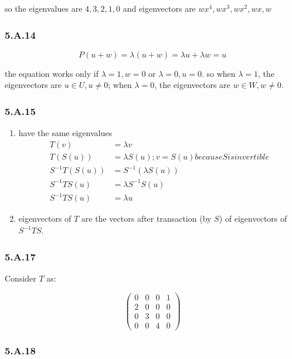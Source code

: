so the eigenvalues are $4, 3, 2, 1, 0$ and eigenvectors are $wx^{4}, wx^{3}, wx^{2}, wx, w$

\subsubsection*{5.A.14}

\[P(u+w) = \lambda (u+w) = \lambda u + \lambda w = u\]

the equation works only if $\lambda = 1, w=0$ or $\lambda = 0, u = 0$.
so when $\lambda = 1$, the eigenvectors are $ u\in U, u\neq 0$; when $\lambda = 0$, the eigenvectors are $w \in W, w\neq 0$.

\subsubsection*{5.A.15}
\begin{enumerate}[label=(\alph*)]
\item have the same eigenvalues
\begin{equation*}
    \begin{split}
    T(v) &= \lambda v \\
    T(S(u)) &= \lambda S(u) ; v = S(u) because S is invertible \\
    S^{-1}T(S(u)) &= S^{-1}(\lambda S(u)) \\
    S^{-1}TS(u) &= \lambda S^{-1}S(u) \\
    S^{-1}TS(u) &= \lambda u
\end{split}
\end{equation*}

\item eigenvectors of $T$  are the vectors after transaction (by $S$) of eigenvectors of $S^{-1}TS$.
\end{enumerate}

\subsubsection*{5.A.17}

Consider $T$ as:

\[
\begin{pmatrix}
0 & 0 & 0 & 1 \\
2 & 0 & 0 & 0 \\
0 & 3 & 0 & 0 \\
0 & 0 & 4 & 0
\end{pmatrix}
\]

\subsubsection*{5.A.18}

